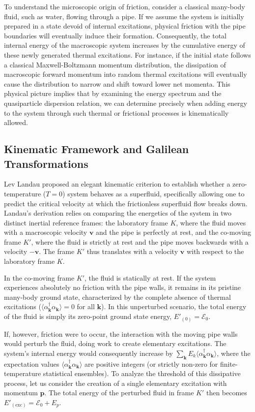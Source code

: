 To understand the microscopic origin of friction, consider a classical many-body fluid, such as water, flowing through a pipe. If we assume the system is initially prepared in a state devoid of internal excitations, physical friction with the pipe boundaries will eventually induce their formation. Consequently, the total internal energy of the macroscopic system increases by the cumulative energy of these newly generated thermal excitations. For instance, if the initial state follows a classical Maxwell-Boltzmann momentum distribution, the dissipation of macroscopic forward momentum into random thermal excitations will eventually cause the distribution to narrow and shift toward lower net momenta. This physical picture implies that by examining the energy spectrum and the quasiparticle dispersion relation, we can determine precisely when adding energy to the system through such thermal or frictional processes is kinematically allowed.

\subsection{Kinematic Framework and Galilean Transformations}

Lev Landau proposed an elegant kinematic criterion to establish whether a zero-temperature (\( T = 0 \)) system behaves as a superfluid, specifically allowing one to predict the critical velocity at which the frictionless superfluid flow breaks down. Landau's derivation relies on comparing the energetics of the system in two distinct inertial reference frames: the laboratory frame \( K \), where the fluid moves with a macroscopic velocity \( \mathbf{v} \) and the pipe is perfectly at rest, and the co-moving frame \( K' \), where the fluid is strictly at rest and the pipe moves backwards with a velocity \( -\mathbf{v} \). The frame \( K' \) thus translates with a velocity \( \mathbf{v} \) with respect to the laboratory frame \( K \).

In the co-moving frame \( K' \), the fluid is statically at rest. If the system experiences absolutely no friction with the pipe walls, it remains in its pristine many-body ground state, characterized by the complete absence of thermal excitations (\( \langle \alpha_{\mathbf{k}}^\dagger \alpha_{\mathbf{k}} \rangle = 0 \) for all \( \mathbf{k} \)). In this unperturbed scenario, the total energy of the fluid is simply its zero-point ground state energy, \( E'_{(0)} = \mathcal{E}_0 \).

If, however, friction were to occur, the interaction with the moving pipe walls would perturb the fluid, doing work to create elementary excitations. The system's internal energy would consequently increase by \( \sum_{\mathbf{k}} E_k \langle \alpha_{\mathbf{k}}^\dagger \alpha_{\mathbf{k}} \rangle \), where the expectation values \( \langle \alpha_{\mathbf{k}}^\dagger \alpha_{\mathbf{k}} \rangle \) are positive integers (or strictly non-zero for finite-temperature statistical ensembles). To analyze the threshold of this dissipative process, let us consider the creation of a single elementary excitation with momentum \( \mathbf{p} \). The total energy of the perturbed fluid in frame \( K' \) then becomes \( E'_{(\text{exc})} = \mathcal{E}_0 + E_p \).

